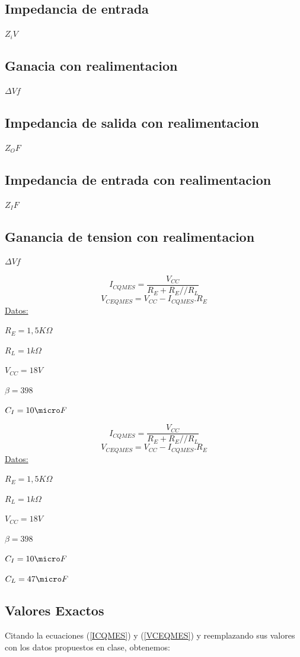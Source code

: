 \documentclass[12pt]{article}
\begin{document}
\subsection{Impedancia de entrada }
$Z_iV$
\subsection{Ganacia con realimentacion }
$\Delta Vf$
\subsection{Impedancia de salida con realimentacion }
$Z_OF$
\subsection{Impedancia de entrada con realimentacion }
$Z_IF$
\subsection{Ganancia de tension con realimentacion }
$\Delta Vf$

\begin{equation}
\label{ICQMES}
I_{CQMES}=\dfrac{V_{CC}}{R_E+R_E//R_L}
\end{equation}
\begin{equation}
\label{VCEQMES}
V_{CEQMES}=V_{CC}-I_{CQMES}.R_E
\end{equation}
\underline{Datos:}

$R_E=1,5 K\Omega$
 
$R_L=1k\Omega$

$V_{CC}=18V$

$\beta = 398$ 

$C_I=10\micro F$

\begin{equation}
\label{ICQMES}
I_{CQMES}=\dfrac{V_{CC}}{R_E+R_E//R_L}
\end{equation}
\begin{equation}
\label{VCEQMES}
V_{CEQMES}=V_{CC}-I_{CQMES}.R_E
\end{equation}
\underline{Datos:}

$R_E=1,5 K\Omega$
 
$R_L=1k\Omega$

$V_{CC}=18V$

$\beta = 398$ 

$C_I=10\micro F$

$C_L=47\micro F$
\subsection{Valores Exactos}
Citando la ecuaciones (\ref{ICQMES}) y (\ref{VCEQMES}) y reemplazando sus valores con los datos propuestos en clase, obtenemos:
\end{document}
